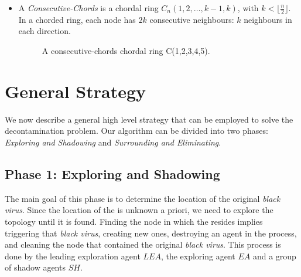\begin{itemize}
\item A {\em Consecutive-Chords} is a chordal ring  $C_n(1,2,\ldots,k-1,k)$, with  $k < \lfloor\frac{n}{2}\rfloor$.
 In a  chorded ring, each node  has $2k$ consecutive  neighbours: $k$ neighbours in each direction. 
\begin{figure}[H]
  \centering
  \caption{A consecutive-chords chordal ring C(1,2,3,4,5).}
\end{figure}

\end{itemize}











\section{General Strategy}

 We now describe a general high level strategy that can be employed to solve  
  the \bv decontamination problem. 
  Our algorithm  can be divided into two phases: {\it Exploring and Shadowing} and {\it Surrounding and Eliminating}.

\subsection{Phase 1: Exploring and Shadowing}
The main goal of this phase is to determine the location of the original {\it black virus}. Since the location of the \bv is unknown a priori, we need to explore the topology until it is found. Finding the node in which the \bv resides implies triggering that {\it black virus}, creating new ones, destroying an agent in the process, and cleaning the node that contained the original  {\it black virus}. This process is done by the  leading exploration agent $LEA$, the exploring agent $EA$ and a group of shadow agents $SH$. 

